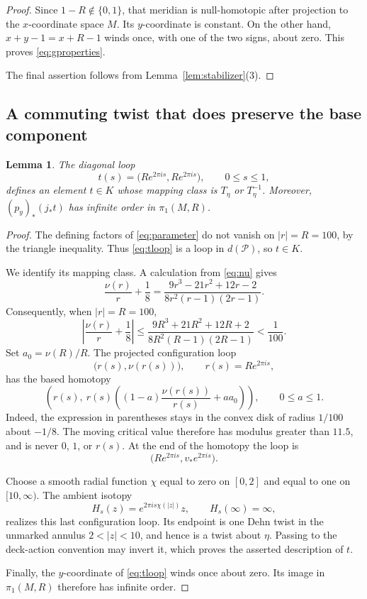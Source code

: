 \documentclass[11pt]{article}
\newcommand{\Par}{\mathcal P}
\newtheorem{lemma}[theorem]{Lemma}
\theoremstyle{definition}
\theoremstyle{remark}
\begin{document}
\begin{proof}
Since $1-R\notin\{0,1\}$, that meridian is null-homotopic after
projection to the $x$-coordinate space $M$.  Its $y$-coordinate is
constant.  On the other hand, $x+y-1=x+R-1$ winds once, with one of
the two signs, about zero.  This proves \eqref{eq:gproperties}.

The final assertion follows from Lemma~\ref{lem:stabilizer}(3).
\end{proof}

\subsection{A commuting twist that does preserve the base component}


\begin{lemma}\label{lem:cusp}
The diagonal loop
\begin{equation}\label{eq:tloop}
t(s)=\bigl(Re^{2\pi is},Re^{2\pi is}\bigr),
\qquad 0\le s\le1,
\end{equation}
defines an element $t\in K$ whose mapping class is
$T_\eta$ or $T_\eta^{-1}$.
Moreover, $(p_y)_*(j_*t)$ has infinite order in $\pi_1(M,R)$.
\end{lemma}

\begin{proof}
The defining factors of \eqref{eq:parameter} do not vanish on
$|r|=R=100$, by the triangle inequality.  Thus \eqref{eq:tloop}
is a loop in $d(\Par)$, so $t\in K$.

We identify its mapping class.  A calculation from \eqref{eq:nu}
gives
\[
\frac{\nu(r)}r+\frac18
=
\frac{9r^3-21r^2+12r-2}
     {8r^2(r-1)(2r-1)}.
\]
Consequently, when $|r|=R=100$,
\begin{equation}\label{eq:estimate}
\left|\frac{\nu(r)}r+\frac18\right|
\le
\frac{9R^3+21R^2+12R+2}
     {8R^2(R-1)(2R-1)}
<\frac1{100}.
\end{equation}
Set $a_0=\nu(R)/R$.
The projected configuration loop
\[
\bigl(r(s),\nu(r(s))\bigr),\qquad r(s)=Re^{2\pi is},
\]
has the based homotopy
\[
\left(
r(s),\
r(s)\left((1-a)\frac{\nu(r(s))}{r(s)}+aa_0\right)
\right),
\qquad 0\le a\le1.
\]
Indeed, the expression in parentheses stays in the convex disk
of radius $1/100$ about $-1/8$.
The moving critical value therefore has modulus greater than
$11.5$, and is never $0$, $1$, or $r(s)$.
At the end of the homotopy the loop is
\[
\bigl(Re^{2\pi is},v_*e^{2\pi is}\bigr).
\]

Choose a smooth radial function $\chi$ equal to zero on $[0,2]$
and equal to one on $[10,\infty)$.
The ambient isotopy
\[
H_s(z)=e^{2\pi is\chi(|z|)}z,\qquad H_s(\infty)=\infty,
\]
realizes this last configuration loop.  Its endpoint is one Dehn
twist in the unmarked annulus $2<|z|<10$, and hence is a twist
about $\eta$.  Passing to the deck-action convention may invert
it, which proves the asserted description of $t$.

Finally, the $y$-coordinate of \eqref{eq:tloop} winds once about zero.
Its image in $\pi_1(M,R)$ therefore has infinite order.
\end{proof}
\end{document}
